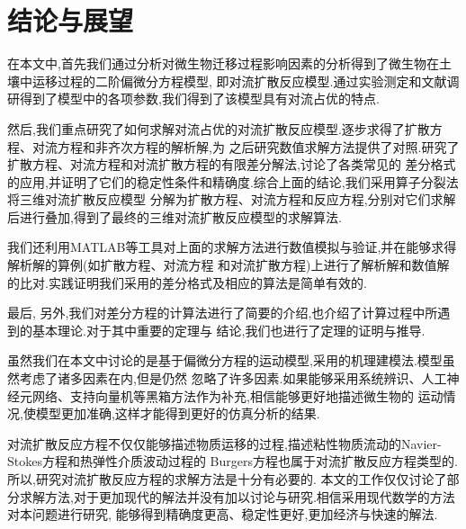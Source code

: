 \chapter{结论与展望}
在本文中,首先我们通过分析对微生物迁移过程影响因素的分析得到了微生物在土壤中运移过程的二阶偏微分方程模型,
即对流扩散反应模型.通过实验测定和文献调研得到了模型中的各项参数,我们得到了该模型具有对流占优的特点.\par
然后,我们重点研究了如何求解对流占优的对流扩散反应模型.逐步求得了扩散方程、对流方程和非齐次方程的解析解,为
之后研究数值求解方法提供了对照.研究了扩散方程、对流方程和对流扩散方程的有限差分解法,讨论了各类常见的
差分格式的应用,并证明了它们的稳定性条件和精确度.综合上面的结论,我们采用算子分裂法将三维对流扩散反应模型
分解为扩散方程、对流方程和反应方程,分别对它们求解后进行叠加,得到了最终的三维对流扩散反应模型的求解算法.\par
我们还利用MATLAB等工具对上面的求解方法进行数值模拟与验证,并在能够求得解析解的算例(如扩散方程、对流方程
和对流扩散方程)上进行了解析解和数值解的比对.实践证明我们采用的差分格式及相应的算法是简单有效的.\par
最后,
另外,我们对差分方程的计算法进行了简要的介绍,也介绍了计算过程中所遇到的基本理论.对于其中重要的定理与
结论,我们也进行了定理的证明与推导.\par
虽然我们在本文中讨论的是基于偏微分方程的运动模型,采用的机理建模法.模型虽然考虑了诸多因素在内,但是仍然
忽略了许多因素.如果能够采用系统辨识、人工神经元网络、支持向量机等黑箱方法作为补充,相信能够更好地描述微生物的
运动情况,使模型更加准确,这样才能得到更好的仿真分析的结果.\par
对流扩散反应方程不仅仅能够描述物质运移的过程,描述粘性物质流动的Navier-Stokes方程和热弹性介质波动过程的
Burgers方程也属于对流扩散反应方程类型的.所以,研究对流扩散反应方程的求解方法是十分有必要的.
本文的工作仅仅讨论了部分求解方法,对于更加现代的解法并没有加以讨论与研究.相信采用现代数学的方法对本问题进行研究,
能够得到精确度更高、稳定性更好,更加经济与快速的解法.